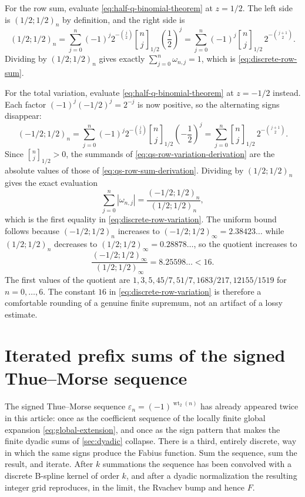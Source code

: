 \documentclass[11pt,oneside]{article}
\theoremstyle{definition}
\theoremstyle{remark}
\newcommand{\wt}{\operatorname{wt}_2}
\newcommand{\qbinom}[3]{\genfrac{[}{]}{0pt}{}{#1}{#2}_{#3}}
\begin{document}
For the row sum, evaluate \eqref{eq:half-q-binomial-theorem} at $z=1/2$.  The left side is
$(1/2;1/2)_n$ by definition, and the right side is
\begin{equation}
 (1/2;1/2)_n
 =\sum_{j=0}^{n}(-1)^j2^{-\binom j2}\qbinom nj{1/2}\left(\frac12\right)^{j}
 =\sum_{j=0}^{n}(-1)^j\qbinom nj{1/2}\,2^{-\binom{j+1}2}.  \label{eq:qs-row-sum-derivation}
\end{equation}
Dividing by $(1/2;1/2)_n$ gives exactly $\sum_{j=0}^{n}\omega_{n,j}=1$, which is
\eqref{eq:discrete-row-sum}.

For the total variation, evaluate \eqref{eq:half-q-binomial-theorem} at $z=-1/2$ instead.
Each factor $(-1)^j(-1/2)^j=2^{-j}$ is now positive, so the alternating signs disappear:
\begin{equation}
 (-1/2;1/2)_n
 =\sum_{j=0}^{n}(-1)^j2^{-\binom j2}\qbinom nj{1/2}\left(-\frac12\right)^{j}
 =\sum_{j=0}^{n}\qbinom nj{1/2}\,2^{-\binom{j+1}2}.        \label{eq:qs-row-variation-derivation}
\end{equation}
Since $\qbinom nj{1/2}>0$, the summands of \eqref{eq:qs-row-variation-derivation} are the
absolute values of those of \eqref{eq:qs-row-sum-derivation}.  Dividing by $(1/2;1/2)_n$
gives the exact evaluation
\begin{equation}
 \sum_{j=0}^{n}|\omega_{n,j}|=\frac{(-1/2;1/2)_n}{(1/2;1/2)_n}, \label{eq:qs-row-variation-exact}
\end{equation}
which is the first equality in \eqref{eq:discrete-row-variation}.  The uniform bound follows
because $(-1/2;1/2)_n$ increases to $(-1/2;1/2)_\infty=2.38423\ldots$ while $(1/2;1/2)_n$
decreases to $(1/2;1/2)_\infty=0.28878\ldots$, so the quotient increases to
\begin{equation}
 \frac{(-1/2;1/2)_\infty}{(1/2;1/2)_\infty}=8.25598\ldots<16. \label{eq:qs-row-variation-limit}
\end{equation}
The first values of the quotient are $1,3,5,45/7,51/7,1683/217,12155/1519$ for
$n=0,\ldots,6$.  The constant $16$ in \eqref{eq:discrete-row-variation} is therefore a
comfortable rounding of a genuine finite supremum, not an artifact of a lossy estimate.

\section{Iterated prefix sums of the signed Thue--Morse sequence}
\label{tm:sec-prefix}

The signed Thue--Morse sequence $\varepsilon_n=(-1)^{\wt(n)}$ has already appeared twice in
this article: once as the coefficient sequence of the locally finite global expansion
\eqref{eq:global-extension}, and once as the sign pattern that makes the finite dyadic sums
of \cref{sec:dyadic} collapse.  There is a third, entirely discrete, way in which
the same signs produce the Fabius function.  Sum the sequence, sum the result, and iterate.
After $k$ summations the sequence has been convolved with a discrete B-spline kernel of
order $k$, and after a dyadic normalization the resulting integer grid reproduces, in the
limit, the Rvachev bump and hence $F$.
\end{document}
